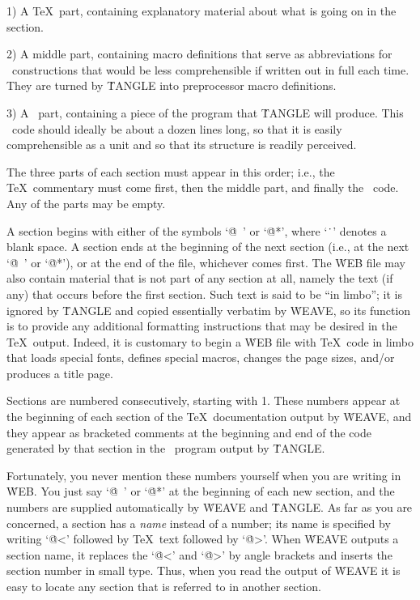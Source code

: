 \yskip\item{1)} A \TeX\ part, containing explanatory material about what
is going on in the section.

\item{2)} A middle part, containing macro definitions that serve as
abbreviations for \Cee\ constructions that would be less comprehensible
if written out in full each time. They are turned by \.{TANGLE} into
preprocessor macro definitions.

\item{3)} A \Cee\ part, containing a piece of the program that
\.{TANGLE} will produce. This \Cee\ code should ideally be about a
dozen lines long, so that it is easily comprehensible as a unit and so
that its structure is readily perceived.

\yskip\noindent The three parts of each section must appear in this order;
i.e., the \TeX\ commentary must come first, then the middle part, and
finally the \Cee\ code. Any of the parts may be empty.

A section begins with either of the symbols `\.{@\ }' or `\.{@*}', where
`\.{\ }' denotes a blank space. A section ends
at the beginning of the next section (i.e., at the next
`\.{@\ }' or `\.{@*}'), or at the end of the file, whichever comes first.
The \.{WEB} file may also contain material that is not part of any section
at all, namely the text (if any) that occurs before the first section.
Such text is said to be ``in limbo''; it is ignored by \.{TANGLE}
and copied essentially verbatim by \.{WEAVE}, so its function is to
provide any additional formatting instructions that may be desired in the
\TeX\ output. Indeed, it is customary to begin a \.{WEB} file with
\TeX\ code in limbo that loads special fonts, defines special macros,
changes the page sizes, and/or produces a title page.

Sections are numbered consecutively, starting with 1. These numbers appear
at the beginning of each section of the \TeX\ documentation output by
\.{WEAVE}, and they appear
as bracketed comments at the beginning and end of the code generated by that
section in the \Cee\ program output by \.{TANGLE}.

Fortunately, you never mention these numbers yourself when you are writing
in \.{WEB}. You just say `\.{@\ }' or `\.{@*}' at the beginning of each
new section, and the numbers are supplied automatically by \.{WEAVE} and
\.{TANGLE}. As far as you are concerned, a section has a
{\sl name\/} instead of a number; its name is specified by writing
`\.{@<}' followed by \TeX\ text followed by `\.{@>}'. When \.{WEAVE}
outputs a section name, it replaces the `\.{@<}' and `\.{@>}' by
angle brackets and inserts the section number in small type. Thus, when you
read the output of \.{WEAVE} it is easy to locate any section that is
referred to in another section.

